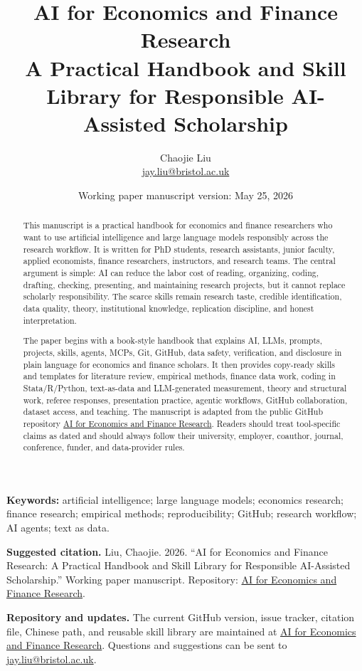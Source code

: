 \documentclass[11pt]{article}
\title{\textbf{AI for Economics and Finance Research}\\
\large A Practical Handbook and Skill Library for Responsible AI-Assisted Scholarship}
\author{Chaojie Liu\\
\href{mailto:jay.liu@bristol.ac.uk}{jay.liu@bristol.ac.uk}\\
\repo}
\date{Working paper manuscript version: May 25, 2026}
\makeatletter
\newcommand{\repo}{\href{https://github.com/SuperJayLiu/AI-for-Economics-and-Finance-Research}{AI for Economics and Finance Research}}
\newcommand{\contact}{\href{mailto:jay.liu@bristol.ac.uk}{jay.liu@bristol.ac.uk}}
\makeatother
\begin{document}
\maketitle

\begin{abstract}
This manuscript is a practical handbook for economics and finance researchers who want to use artificial intelligence and large language models responsibly across the research workflow. It is written for PhD students, research assistants, junior faculty, applied economists, finance researchers, instructors, and research teams. The central argument is simple: AI can reduce the labor cost of reading, organizing, coding, drafting, checking, presenting, and maintaining research projects, but it cannot replace scholarly responsibility. The scarce skills remain research taste, credible identification, data quality, theory, institutional knowledge, replication discipline, and honest interpretation.

The paper begins with a book-style handbook that explains AI, LLMs, prompts, projects, skills, agents, MCPs, Git, GitHub, data safety, verification, and disclosure in plain language for economics and finance scholars. It then provides copy-ready skills and templates for literature review, empirical methods, finance data work, coding in Stata/R/Python, text-as-data and LLM-generated measurement, theory and structural work, referee responses, presentation practice, agentic workflows, GitHub collaboration, dataset access, and teaching. The manuscript is adapted from the public GitHub repository \repo. Readers should treat tool-specific claims as dated and should always follow their university, employer, coauthor, journal, conference, funder, and data-provider rules.
\end{abstract}

\noindent\textbf{Keywords:} artificial intelligence; large language models; economics research; finance research; empirical methods; reproducibility; GitHub; research workflow; AI agents; text as data.

\vspace{0.5em}
\noindent\textbf{Suggested citation.} Liu, Chaojie. 2026. ``AI for Economics and Finance Research: A Practical Handbook and Skill Library for Responsible AI-Assisted Scholarship.'' Working paper manuscript. Repository: \repo.

\vspace{0.5em}
\noindent\textbf{Repository and updates.} The current GitHub version, issue tracker, citation file, Chinese path, and reusable skill library are maintained at \repo. Questions and suggestions can be sent to \contact.
\end{document}
